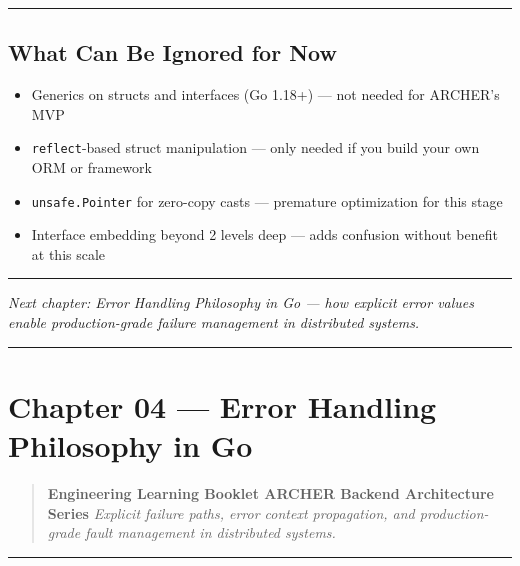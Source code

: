\documentclass[
]{article}
\providecommand{\tightlist}{%
  \setlength{\itemsep}{0pt}\setlength{\parskip}{0pt}}
\begin{document}
\begin{center}\rule{0.5\linewidth}{0.5pt}\end{center}

\hypertarget{what-can-be-ignored-for-now-2}{%
\subsection{What Can Be Ignored for
Now}\label{what-can-be-ignored-for-now-2}}

\begin{itemize}
\tightlist
\item
  Generics on structs and interfaces (Go 1.18+) --- not needed for
  ARCHER's MVP
\item
  \texttt{reflect}-based struct manipulation --- only needed if you
  build your own ORM or framework
\item
  \texttt{unsafe.Pointer} for zero-copy casts --- premature optimization
  for this stage
\item
  Interface embedding beyond 2 levels deep --- adds confusion without
  benefit at this scale
\end{itemize}

\begin{center}\rule{0.5\linewidth}{0.5pt}\end{center}

\emph{Next chapter: Error Handling Philosophy in Go --- how explicit
error values enable production-grade failure management in distributed
systems.}

\begin{center}\rule{0.5\linewidth}{0.5pt}\end{center}

\hypertarget{chapter-04-error-handling-philosophy-in-go}{%
\section{Chapter 04 --- Error Handling Philosophy in
Go}\label{chapter-04-error-handling-philosophy-in-go}}

\begin{quote}
\textbf{Engineering Learning Booklet \textbar{} ARCHER Backend
Architecture Series} \emph{Explicit failure paths, error context
propagation, and production-grade fault management in distributed
systems.}
\end{quote}

\begin{center}\rule{0.5\linewidth}{0.5pt}\end{center}
\end{document}
